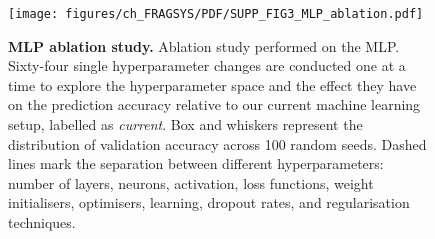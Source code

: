 \begin{figure}[ht!]
    \centering
    \texttt{[image: figures/ch\_FRAGSYS/PDF/SUPP\_FIG3\_MLP\_ablation.pdf]}
    \caption[MLP ablation study]{\textbf{MLP ablation study.} Ablation study performed on the MLP. Sixty-four single hyperparameter changes are conducted one at a time to explore the hyperparameter space and the effect they have on the prediction accuracy relative to our current machine learning setup, labelled as \textit{current}. Box and whiskers represent the distribution of validation accuracy across 100 random seeds. Dashed lines mark the separation between different hyperparameters: number of layers, neurons, activation, loss functions, weight initialisers, optimisers, learning, dropout rates, and regularisation techniques.}
    \label{fig:mlp_ablation}
\end{figure}

